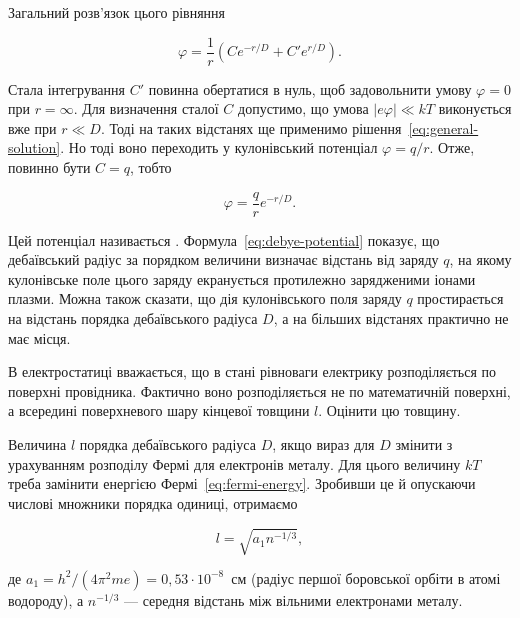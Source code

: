 Загальний розв'язок цього рівняння

\begin{equation}\label{eq:general-solution}
	\varphi = \frac{1}{r}\left(Ce^{-r/D} + C'e^{r/D}\right).
\end{equation}

Стала інтегрування $C'$ повинна обертатися в нуль, щоб задовольнити умову $\varphi = 0$ при $r = \infty$. Для визначення сталої $C$ допустимо, що умова $|e\varphi| \ll kT$ виконується вже при $r \ll D$. Тоді на таких відстанях ще применимо рішення~\eqref{eq:general-solution}. Но тоді воно переходить у кулонівський потенціал $\varphi = q/r$. Отже, повинно бути $C = q$, тобто

\begin{equation}\label{eq:debye-potential}
	\varphi = \frac{q}{r}e^{-r/D}.
\end{equation}

Цей потенціал називається . Формула~\eqref{eq:debye-potential} показує, що дебаївський радіус за порядком величини визначає відстань від заряду $q$, на якому кулонівське поле цього заряду екранується протилежно зарядженими іонами плазми. Можна також сказати, що дія кулонівського поля заряду $q$ простирається на відстань порядка дебаївського радіуса $D$, а на більших відстанях практично не має місця.

\begin{problem}\label{prb:surface-layer-thickness}
	В електростатиці вважається, що в стані рівноваги електрику розподіляється по поверхні провідника. Фактично воно розподіляється не по математичній поверхні, а всередині поверхневого шару кінцевої товщини $l$. Оцінити цю товщину.
\end{problem}

 Величина $l$ порядка дебаївського радіуса $D$, якщо вираз для $D$ змінити з урахуванням розподілу Фермі для електронів металу. Для цього величину $kT$ треба замінити енергією Фермі~\eqref{eq:fermi-energy}. Зробивши це й опускаючи числові множники порядка одиниці, отримаємо

\begin{equation*}
	l = \sqrt{a_1 n^{-1/3}},
\end{equation*}

де $a_1 = h^2/(4\pi^2 me) = 0{,}53\cdot10^{-8}$~см (радіус першої боровської орбіти в атомі водороду), а $n^{-1/3}$ --- середня відстань між вільними електронами металу.


